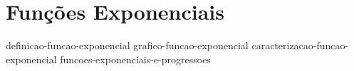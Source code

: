 \section{Funções Exponenciais}

{definicao-funcao-exponencial}
{grafico-funcao-exponencial}
{caracterizacao-funcao-exponencial}
{funcoes-exponenciais-e-progressoes}